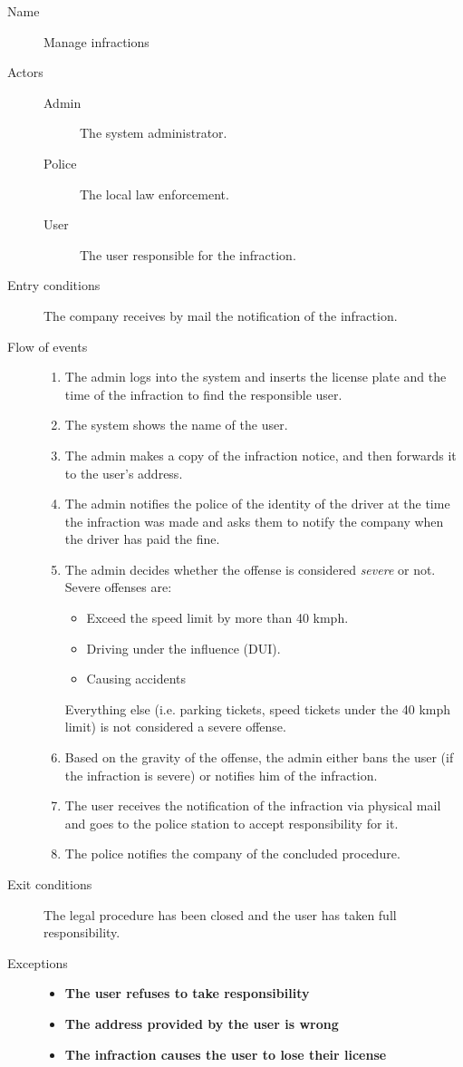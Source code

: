 	\begin{description}
		\item[Name] Manage infractions
		\item[Actors] \hfill
			\begin{description}
				\item[Admin] The system administrator.
				\item[Police] The local law enforcement.
				\item[User] The user responsible for the infraction.
			\end{description}
		\item[Entry conditions] The company receives by mail the notification of the infraction.
		\item[Flow of events] \hfill
			\begin{enumerate}
				\item The admin logs into the system and inserts the license plate and the time of the infraction to find the responsible user.
				\item The system shows the name of the user.
				\item The admin makes a copy of the infraction notice, and then forwards it to the user's address.
				\item The admin notifies the police of the identity of the driver at the time the infraction was made and asks them to notify the company when the driver has paid the fine.
				\item The admin decides whether the offense is considered \textit{severe} or not. Severe offenses are:
					\begin{itemize}
						\item Exceed the speed limit by more than 40 kmph.
						\item Driving under the influence (DUI).
						\item Causing accidents %
					\end{itemize}
					Everything else (i.e. parking tickets, speed tickets under the 40 kmph limit) is not considered a severe offense.
				\item Based on the gravity of the offense, the admin either bans the user (if the infraction is severe) or notifies him of the infraction.
				\item The user receives the notification of the infraction via physical mail and goes to the police station to accept responsibility for it.
				\item The police notifies the company of the concluded procedure.
			\end{enumerate}
		\item[Exit conditions] The legal procedure has been closed and the user has taken full responsibility.
		\item[Exceptions] \hfill
			\begin{itemize} %
				\item \textbf{The user refuses to take responsibility}
				\item \textbf{The address provided by the user is wrong}
				\item \textbf{The infraction causes the user to lose their license}
			\end{itemize}
	\end{description}